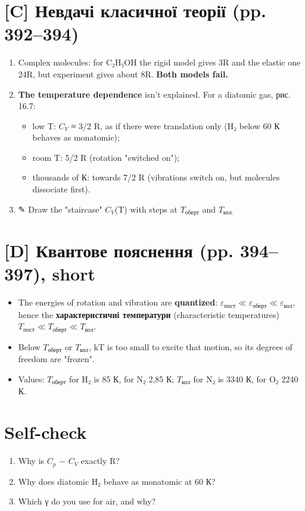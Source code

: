 \documentclass[11pt,a4paper,oneside]{book}
\newcommand{\pen}{{\sffamily\color{accent}✎}}
\begin{document}
\section*{[C] Невдачі класичної теорії (pp. 392–394)}
\begin{enumerate}
\item Complex molecules: for C₂H₅OH the rigid model gives 3R and the elastic one 24R, but experiment gives about 8R. \textbf{Both models fail.}
\item \textbf{The temperature dependence} isn't explained. For a diatomic gas, рис. 16.7:
\begin{itemize}
\item low T: $C_{V}$ ≈ 3/2 R, as if there were translation only (H₂ below 60 К behaves as monatomic);
\item room T: 5/2 R (rotation "switched on");
\item thousands of К: towards 7/2 R (vibrations switch on, but molecules dissociate first).
\end{itemize}
\item \pen{} Draw the "staircase" $C_{V}$(T) with steps at $T_{\text{оберт}}$ and $T_{\text{кол}.}$
\end{enumerate}

\section*{[D] Квантове пояснення (pp. 394–397), short}
\begin{itemize}
\item The energies of rotation and vibration are \textbf{quantized}: $\varepsilon_{\text{пост}} \ll \varepsilon_{\text{оберт}} \ll \varepsilon_{\text{кол}}$, hence the \textbf{характеристичні температури} (characteristic temperatures) $T_{\text{пост}} \ll T_{\text{оберт}} \ll T_{\text{кол}}$.
\item Below $T_{\text{оберт}}$ or $T_{\text{кол}}$, kT is too small to excite that motion, so its degrees of freedom are "frozen".
\item Values: $T_{\text{оберт}}$ for H₂ is 85 К, for N₂ 2,85 К; $T_{\text{кол}}$ for N₂ is 3340 К, for O₂ 2240 К.
\end{itemize}

\section*{Self-check}
\begin{enumerate}
\item Why is $C_{p}$ − $C_{V}$ exactly R?
\item Why does diatomic H₂ behave as monatomic at 60 К?
\item Which γ do you use for air, and why?
\end{enumerate}
\end{document}
